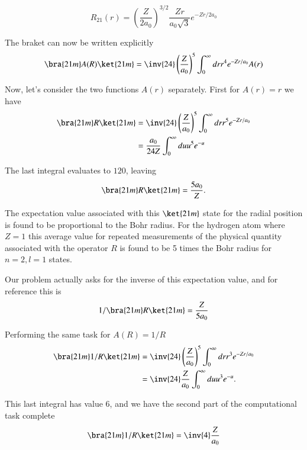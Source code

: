 \begin{equation}\label{eqn:qmIproblemSet4:210}
R_{21}(r) = 
\left(\frac{Z}{2a_0}\right)^{3/2} \frac{ Z r }{a_0 \sqrt{3}} e^{-Z r/2 a_0}
\end{equation}

The braket can now be written explicitly 
\begin{equation}\label{eqn:qmIproblemSet4:212}
\bra{21m} A(R) \ket{21m}
=
\inv{24} \left(\frac{ Z }{a_0 } \right)^5
\int_0^\infty
dr 
r^4 
e^{-Z r/ a_0}
A(r)
\end{equation}

Now, let's consider the two functions $A(r)$ separately.  First for $A(r) = r$ we have
\begin{align*}
\bra{21m} R \ket{21m}
&=
\inv{24} \left(\frac{ Z }{a_0 } \right)^5
\int_0^\infty
dr 
r^5 
e^{-Z r/ a_0} 
\\
&=
\frac{ a_0 }{ 24 Z } 
\int_0^\infty
du 
u^5 
e^{-u} 
\\
\end{align*}

The last integral evaluates to $120$, leaving
\begin{equation}\label{eqn:qmIproblemSet4:220a}
\bra{21m} R \ket{21m}
=
\frac{ 5 a_0 }{ Z }.
\end{equation}

The expectation value associated with this $\ket{21m}$ state for the radial position is found to be proportional to the Bohr radius.  For the hydrogen atom where $Z=1$ this average value for repeated measurements of the physical quantity associated with the operator $R$ is found to be 5 times the Bohr radius for $n=2, l=1$ states.

Our problem actually asks for the inverse of this expectation value, and for reference this is
\begin{equation}\label{eqn:qmIproblemSet4:220}
1/ \bra{21m} R \ket{21m}
=
\frac{ Z }{ 5 a_0 } %
\end{equation}

Performing the same task for $A(R) = 1/R$
\begin{align*}
\bra{21m} 1/R \ket{21m}
&=
\inv{24} \left(\frac{ Z }{a_0 } \right)^5
\int_0^\infty
dr 
r^3
e^{-Z r/ a_0} 
\\
&=
\inv{24} \frac{ Z }{ a_0 } 
\int_0^\infty
du 
u^3
e^{-u}.
\end{align*}

This last integral has value $6$, and we have the second part of the computational task complete
\begin{equation}\label{eqn:qmIproblemSet4:225}
\bra{21m} 1/R \ket{21m} = \inv{4} \frac{ Z }{ a_0 } 
\end{equation}

